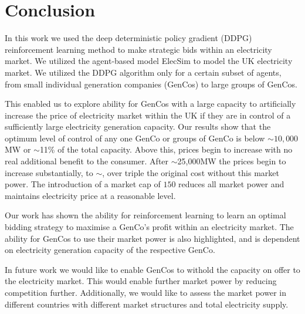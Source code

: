 
\section{Conclusion}
\label{sec:conclusion}

In this work we used the deep deterministic policy gradient (DDPG) reinforcement learning method to make strategic bids within an electricity market. We utilized the agent-based model ElecSim to model the UK electricity market. We utilized the DDPG algorithm only for a certain subset of agents, from small individual generation companies (GenCos) to large groups of GenCos. 

This enabled us to explore ability for GenCos with a large capacity to artificially increase the price of electricity market within the UK if they are in control of a sufficiently large electricity generation capacity. Our results show that the optimum level of control of any one GenCo or groups of GenCo is below ${\sim}10,000$MW or ${\sim}$11\% of the total capacity. Above this, prices begin to increase with no real additional benefit to the consumer. After ${\sim}$25,000MW the prices begin to increase substantially, to ${\sim}$, over triple the original cost without this market power. The introduction of a market cap of \textsterling$150$ reduces all market power and maintains electricity price at a reasonable level.

Our work has shown the ability for reinforcement learning to learn an optimal bidding strategy to maximise a GenCo's profit within an electricity market. The ability for GenCos to use their market power is also highlighted, and is dependent on electricity generation capacity of the respective GenCo.

In future work we would like to enable GenCos to withold the capacity on offer to the electricity market. This would enable further market power by reducing competition further.  Additionally, we would like to assess the market power in different countries with different market structures and total electricity supply.
